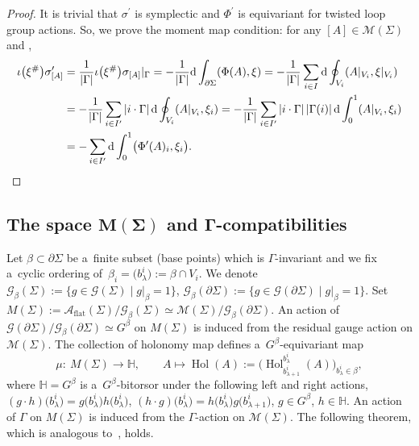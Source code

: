 \documentclass[pdftex]{sigma}
\numberwithin{equation}{section}
\theoremstyle{definition}
\newcommand{\Hol}{\operatorname{Hol}}
\newcommand{\bH}{\mathbb{H}}
\begin{document}
\begin{proof}
 It is trivial that $\sigma^{\prime}$ is symplectic and $\Phi^{\prime}$ is equivariant for twisted loop group actions.
 So, we prove the moment map condition:
 for any $[A] \in \mathcal{M}(\Sigma)$ and ,
\begin{align*}
 \iota\bigl(\xi^{\#}\bigr)\sigma^{\prime}_{[A]} &= \frac{1}{| \Gamma|} \iota\bigl(\xi^{\#}\bigr)\sigma_{[A]}|_{\Gamma}
 = -\frac{1}{| \Gamma|}{\rm d} \int_{\partial \Sigma} (\Phi(A), \xi)
 = -\frac{1}{| \Gamma|} \sum_{i \in I} {\rm d} \oint_{V_i}(A|_{V_i}, \xi|_{V_i}) \\
 &= -\frac{1}{| \Gamma|} \sum_{i \in I^{\prime}} \left| i \cdot \Gamma\right| {\rm d} \oint_{V_i}(A|_{V_i}, \xi_i)
 = -\frac{1}{| \Gamma|} \sum_{i \in I^{\prime}} \left| i \cdot \Gamma\right| \left| \Gamma(i)\right| {\rm d} \int_{0}^{1} (A|_{V_i}, \xi_i) \\
 &
 = - \sum_{i \in I^{\prime}} {\rm d}\int_{0}^{1} \bigl(\Phi^{\prime}(A)_i, \xi_i\bigr).\tag*{\qed}
\end{align*} \renewcommand{\qed}{}
\end{proof}

\subsection[The space M(Sigma) and Gamma-compatibilities]{The space $\boldsymbol{M(\Sigma)}$ and $\boldsymbol{\Gamma}$-compatibilities}


Let $\beta \subset \partial \Sigma$ be a~finite subset (base points) which is $\Gamma$-invariant and we fix a~cyclic ordering of~$\beta_i = \bigl(b^{i}_{\lambda}\bigr) := \beta \cap V_i$.
We denote
$\mathcal{G}_{\beta}(\Sigma) := \{g \in \mathcal{G}(\Sigma)\mid g|_{\beta} = 1\}$, $
 \mathcal{G}_{\beta}(\partial \Sigma) := \{g \in \mathcal{G}(\partial \Sigma)\mid g|_{\beta}=1\}$.
Set $M(\Sigma) := \mathcal{A}_{\mathrm{flat}}(\Sigma)/\mathcal{G}_{\beta}(\Sigma) \simeq \mathcal{M}(\Sigma)/\mathcal{G}_{\beta}(\partial \Sigma)$.
An action of $\mathcal{G}(\partial \Sigma)/\mathcal{G}_{\beta}(\partial \Sigma) \simeq G^{\beta}$ on $M(\Sigma)$ is induced from the residual gauge action on $\mathcal{M}(\Sigma)$.
The collection of holonomy map \smash{$\Hol^{b^i_{\lambda}}_{b^i_{\lambda+1}}(A)$} defines a~$G^{\beta}$-equivariant map
\[
\mu \colon\ M(\Sigma) \to \bH,\qquad A \mapsto \Hol(A) := \bigl(\Hol^{b^i_{\lambda}}_{b^i_{\lambda+1}}(A)\bigr)_{b^i_{\lambda} \in \beta},
\]
where $\bH = G^{\beta}$ is a~$G^{\beta}$-bitorsor under the following left and right actions,
$(g \cdot h)\bigl(b^{i}_{\lambda}\bigr) = g\bigl(b^i_{\lambda}\bigr)h\bigl(b^i_{\lambda}\bigr)$, $
 (h \cdot g)\bigl(b^i_{\lambda}\bigr) = h\bigl(b^i_{\lambda}\bigr)g\bigl(b^{i}_{\lambda+1}\bigr)$, $ g \in G^{\beta}$, $ h \in \bH$.
An action of $\Gamma$ on $M(\Sigma)$ is induced from the $\Gamma$-action on $\mathcal{M}(\Sigma)$.
The following theorem, which is analogous to~\cite[Theorem 9.1]{AMM}, holds.
\end{document}
